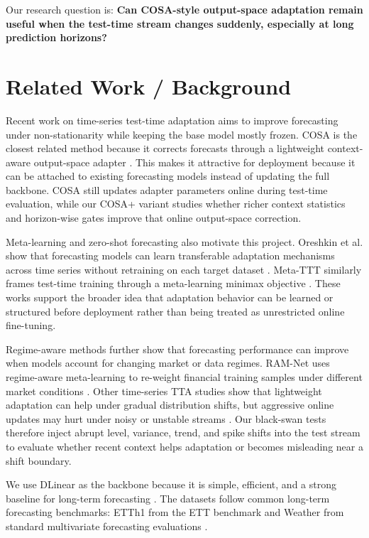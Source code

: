 \documentclass[10pt]{article}
\begin{document}
Our research question is: \textbf{Can COSA-style output-space adaptation remain useful when the test-time stream changes suddenly, especially at long prediction horizons?}

\section{Related Work / Background}
Recent work on time-series test-time adaptation aims to improve forecasting under non-stationarity while keeping the base model mostly frozen. COSA is the closest related method because it corrects forecasts through a lightweight context-aware output-space adapter \cite{cosa2026}. This makes it attractive for deployment because it can be attached to existing forecasting models instead of updating the full backbone. COSA still updates adapter parameters online during test-time evaluation, while our COSA+ variant studies whether richer context statistics and horizon-wise gates improve that online output-space correction.

Meta-learning and zero-shot forecasting also motivate this project. Oreshkin et al. show that forecasting models can learn transferable adaptation mechanisms across time series without retraining on each target dataset \cite{oreshkin2021meta}. Meta-TTT similarly frames test-time training through a meta-learning minimax objective \cite{tao2025metattt}. These works support the broader idea that adaptation behavior can be learned or structured before deployment rather than being treated as unrestricted online fine-tuning.

Regime-aware methods further show that forecasting performance can improve when models account for changing market or data regimes. RAM-Net uses regime-aware meta-learning to re-weight financial training samples under different market conditions \cite{jang2025ramnet}. Other time-series TTA studies show that lightweight adaptation can help under gradual distribution shifts, but aggressive online updates may hurt under noisy or unstable streams \cite{wu2026tta}. Our black-swan tests therefore inject abrupt level, variance, trend, and spike shifts into the test stream to evaluate whether recent context helps adaptation or becomes misleading near a shift boundary.

We use DLinear as the backbone because it is simple, efficient, and a strong baseline for long-term forecasting \cite{zeng2023dlinear}. The datasets follow common long-term forecasting benchmarks: ETTh1 from the ETT benchmark \cite{ett} and Weather from standard multivariate forecasting evaluations \cite{weather}.
\end{document}
